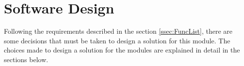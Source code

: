 \newpage
\chapter{Software Design}
    Following the requirements described in the section \ref{ssec:FuncList}, there are
    some decisions that must be taken to design a solution for this module. The choices
    made to design a solution for the modules are explained in detail in the sections below.
    
    
    
    
    
        




